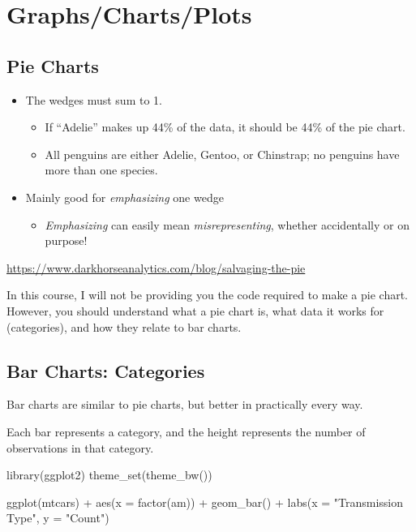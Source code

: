 \documentclass[
  letterpaper,
  DIV=11,
  numbers=noendperiod,
  oneside]{scrreprt}
\newenvironment{Shaded}{\begin{snugshade}}{\end{snugshade}}
\newcommand{\AttributeTok}[1]{\textcolor[rgb]{0.40,0.45,0.13}{#1}}
\newcommand{\FunctionTok}[1]{\textcolor[rgb]{0.28,0.35,0.67}{#1}}
\newcommand{\NormalTok}[1]{\textcolor[rgb]{0.00,0.23,0.31}{#1}}
\newcommand{\SpecialCharTok}[1]{\textcolor[rgb]{0.37,0.37,0.37}{#1}}
\newcommand{\StringTok}[1]{\textcolor[rgb]{0.13,0.47,0.30}{#1}}
\providecommand{\tightlist}{%
  \setlength{\itemsep}{0pt}\setlength{\parskip}{0pt}}\usepackage{longtable,booktabs,array}
\begin{document}
\hypertarget{graphschartsplots}{%
\section{Graphs/Charts/Plots}\label{graphschartsplots}}

\hypertarget{pie-charts}{%
\subsection{Pie Charts}\label{pie-charts}}

\begin{itemize}
\tightlist
\item
  The wedges must sum to 1.

  \begin{itemize}
  \tightlist
  \item
    If ``Adelie'' makes up 44\% of the data, it should be 44\% of the
    pie chart.
  \item
    All penguins are either Adelie, Gentoo, or Chinstrap; no penguins
    have more than one species.
  \end{itemize}
\item
  Mainly good for \emph{emphasizing} one wedge

  \begin{itemize}
  \tightlist
  \item
    \emph{Emphasizing} can easily mean \emph{misrepresenting}, whether
    accidentally or on purpose!
  \end{itemize}
\end{itemize}

\url{https://www.darkhorseanalytics.com/blog/salvaging-the-pie}

In this course, I will not be providing you the code required to make a
pie chart. However, you should understand what a pie chart is, what data
it works for (categories), and how they relate to bar charts.

\hypertarget{bar-charts-categories}{%
\subsection{Bar Charts: Categories}\label{bar-charts-categories}}

Bar charts are similar to pie charts, but better in practically every
way.

Each bar represents a category, and the height represents the number of
observations in that category.

\begin{Shaded}
\begin{Highlighting}[]
\FunctionTok{library}\NormalTok{(ggplot2)}
\FunctionTok{theme\_set}\NormalTok{(}\FunctionTok{theme\_bw}\NormalTok{())}

\FunctionTok{ggplot}\NormalTok{(mtcars) }\SpecialCharTok{+}
    \FunctionTok{aes}\NormalTok{(}\AttributeTok{x =} \FunctionTok{factor}\NormalTok{(am)) }\SpecialCharTok{+}
    \FunctionTok{geom\_bar}\NormalTok{() }\SpecialCharTok{+}
    \FunctionTok{labs}\NormalTok{(}\AttributeTok{x =} \StringTok{"Transmission Type"}\NormalTok{,}
        \AttributeTok{y =} \StringTok{"Count"}\NormalTok{)}
\end{Highlighting}
\end{Shaded}
\end{document}
